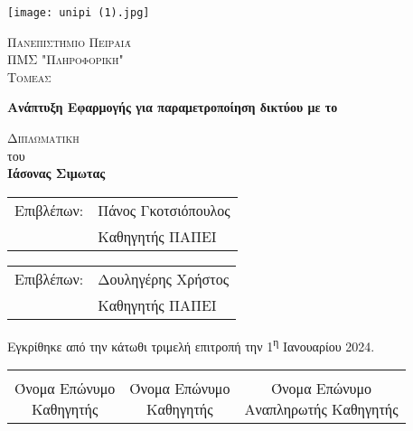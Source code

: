            \begin{center}
	
	       \vspace*{-1cm}

    \texttt{[image: unipi (1).jpg]}
        
    \Large
    \textsc{Πανεπιστήμιο Πειραιά}\\
    \large
    \textsc{ΠΜΣ "Πληροφορική" }\\
    \textsc{Τομεας}
    
    \vspace{1.5cm}
	
	\Huge
    \textbf{Ανάπτυξη Εφαρμογής για παραμετροποίηση δικτύου με το }
        
    \vspace{1.5cm}
    \Large
    \textsc{Διπλωματικη }\\
    του\\

    \LARGE
    \textbf{Ιάσονας Σιμωτας}
    
    \vfill
    \end{center}
    
    \begin{tabular}{ll}
		Επιβλέπων: & Πάνος Γκοτσιόπουλος \\
		 & Καθηγητής ΠΑΠΕΙ
	\end{tabular}

    \begin{tabular}{ll}
		Επιβλέπων: & Δουληγέρης Χρήστος \\
		 & Καθηγητής ΠΑΠΕΙ
	\end{tabular}
	
	\vspace{1.5cm}
    
    Εγκρίθηκε από την κάτωθι τριμελή επιτροπή την 1\textsuperscript{η} Ιανουαρίου 2024.
    
    \vspace{1.5cm}
	
	\begin{center}
	\noindent\begin{tabular}{ccc}
		\makebox[0.3\textwidth]{\hrulefill} & 
		\makebox[0.3\textwidth]{\hrulefill} & 
		\makebox[0.3\textwidth]{\hrulefill} \\

		\specialcell{Όνομα Επώνυμο \\ Καθηγητής} & 
		\specialcell{Όνομα Επώνυμο \\ Καθηγητής} & 
		\specialcell{Όνομα Επώνυμο \\ Αναπληρωτής Καθηγητής} \\ [8ex]%
	\end{tabular}
	\end{center}
